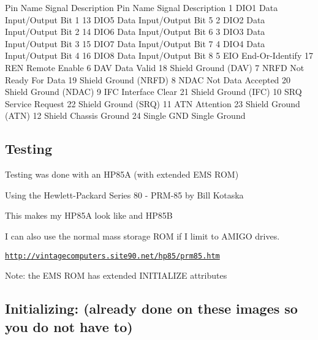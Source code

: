 \begin{DoxyPre}
    Pin Name   Signal Description       Pin Name   Signal Description 
    1   DIO1   Data Input/Output Bit 1  13  DIO5   Data Input/Output Bit 5 
    2   DIO2   Data Input/Output Bit 2  14  DIO6   Data Input/Output Bit 6 
    3   DIO3   Data Input/Output Bit 3  15  DIO7   Data Input/Output Bit 7 
    4   DIO4   Data Input/Output Bit 4  16  DIO8   Data Input/Output Bit 8 
    5   EIO    End-Or-Identify          17  REN    Remote Enable 
    6   DAV    Data Valid               18  Shield Ground (DAV) 
    7   NRFD   Not Ready For Data       19  Shield Ground (NRFD) 
    8   NDAC   Not Data Accepted        20  Shield Ground (NDAC) 
    9   IFC    Interface Clear          21  Shield Ground (IFC) 
    10  SRQ    Service Request          22  Shield Ground (SRQ) 
    11  ATN    Attention                23  Shield Ground (ATN) 
    12  Shield Chassis Ground           24  Single GND Single Ground
\end{DoxyPre}


\subsection*{Testing}


\begin{DoxyItemize}
\item Testing was done with an H\+P85A (with extended E\+MS R\+OM)
\begin{DoxyItemize}
\item Using the Hewlett-\/\+Packard Series 80 -\/ P\+R\+M-\/85 by Bill Kotaska
\item This makes my H\+P85A look like and H\+P85B
\begin{DoxyItemize}
\item I can also use the normal mass storage R\+OM if I limit to A\+M\+I\+GO drives.
\item \href{http://vintagecomputers.site90.net/hp85/prm85.htm}{\tt http\+://vintagecomputers.\+site90.\+net/hp85/prm85.\+htm}
\end{DoxyItemize}
\end{DoxyItemize}
\item Note\+: the E\+MS R\+OM has extended I\+N\+I\+T\+I\+A\+L\+I\+ZE attributes 
\begin{DoxyPre}
\section*{Initializing: (already done on these images so you do not have to)}\end{DoxyPre}

\end{DoxyItemize}


